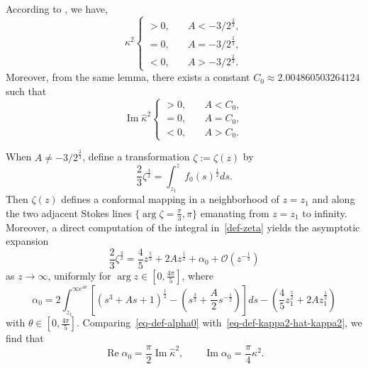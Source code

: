 \documentclass[12pt]{article}
\theoremstyle{plain}
\theoremstyle{definition}
\numberwithin{equation}{section}
\renewcommand\Re{\operatorname{Re}}
\renewcommand\Im{\operatorname{Im}}
\begin{document}
According to \cite[Lemma 2.1]{LongLiWang}, we have,
\begin{equation}
\kappa^{2}\begin{cases}>0, \quad & A<-3/2^{\frac{2}{3}},\\
=0, \quad & A=-3/2^{\frac{2}{3}},\\
<0, \quad & A>-3/2^{\frac{2}{3}}.
\end{cases}
\end{equation}
Moreover, from the same lemma, there exists a constant $C_{0}\approx 2.004 860 503 264 124$ such that
\begin{equation}\label{Imkappa2}
\Im\widehat{\kappa}^2\begin{cases}>0, \quad & A<C_{0},\\
=0, \quad & A=C_{0},\\
<0, \quad & A>C_{0}.
\end{cases}
\end{equation}




When $A\neq -3/2^{\frac{2}{3}}$, define a transformation $\zeta:=\zeta(z)$ by
\begin{equation}
\label{def-zeta}
\frac{2}{3}\zeta^{\frac{3}{2}}=\int_{z_{1}}^{z}f_{0}(s)^{\frac{1}{2}}ds.
\end{equation}
Then $\zeta(z)$ defines a conformal mapping in a neighborhood of $z = z_{1}$ and along the two adjacent Stokes lines $\{\arg{\zeta} = \frac{\pi}{3}, \pi\}$ emanating from $z = z_{1}$ to infinity. Moreover, a direct computation of the integral in~\eqref{def-zeta} yields the asymptotic expansion
\begin{equation}\label{eq-asymp-relation-zeta-z}
\frac{2}{3}\zeta^{\frac{3}{2}}=\frac{4}{5}z^{\frac{5}{2}}+2Az^{\frac{1}{2}}+\alpha_{0}+\mathcal{O}(z^{-\frac{1}{2}})
\end{equation}
as $z \to \infty$, uniformly for $\arg z \in \left[0, \frac{4\pi}{5}\right]$, where
\begin{equation}\label{eq-def-alpha0}
\alpha_{0}=2\int_{z_{1}}^{\infty e^{i\theta}}\left[(s^3+As+1)^{\frac{1}{2}}-(s^{\frac{3}{2}}+\frac{A}{2}s^{-\frac{1}{2}})\right]ds-\left(\frac{4}{5}z_{1}^{\frac{5}{2}}+2Az_{1}^{\frac{1}{2}}\right)
\end{equation}
with $\theta \in \left[0, \frac{4\pi}{5}\right]$. Comparing~\eqref{eq-def-alpha0} with~\eqref{eq-def-kappa2-hat-kappa2}, we find that
\begin{equation}
\Re\alpha_{0}=\frac{\pi}{2}\Im\widehat{\kappa}^2,\qquad
\Im \alpha_{0}=\frac{\pi}{4}\kappa^2.
\end{equation}
\end{document}
